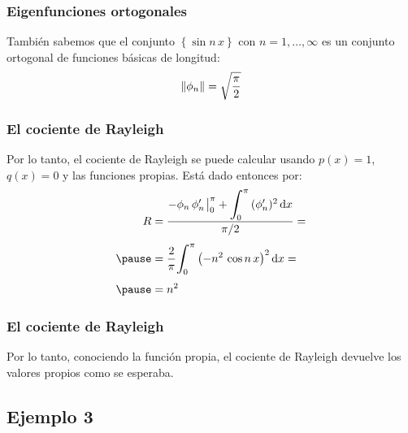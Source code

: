 \documentclass[12pt]{beamer}
\begin{document}
\begin{frame}
\frametitle{Eigenfunciones ortogonales}
También sabemos que el conjunto $\left\{ \sin n \, x \right\}$ con $n = 1, \ldots, \infty$ es un conjunto ortogonal de funciones básicas de longitud:
\pause
\begin{align*}
\norm{\phi_{n}} = \sqrt{\dfrac{\pi}{2}}
\end{align*}
\end{frame}
\begin{frame}
\frametitle{El cociente de Rayleigh}
Por lo tanto, el cociente de Rayleigh se puede calcular usando $p(x) = 1$, $q (x) = 0$ y las funciones propias. \pause Está dado entonces por:
\pause
\begin{eqnarray}
\begin{aligned}[b]
R &= \dfrac{- \phi_{n} \, \pderivada{\phi}_{n} \eval_{0}^{\pi} + \scaleint{6ex}_{\bs 0}^{\pi} \, (\pderivada{\phi}_{n})^{2} \dd{x}}{\pi/2} = \\[0.35em] \pause
&= \dfrac{2}{\pi} \scaleint{6ex}_{\bs 0}^{\pi} \left( - n^{2} \, \cos n \, x \right)^{2} \dd{x} = \\[0.35em] \pause
&= n^{2}
\end{aligned}
\label{eq:ecuacion_04_13}
\end{eqnarray}
\end{frame}
\begin{frame}
\frametitle{El cociente de Rayleigh}
Por lo tanto, conociendo la función propia, el cociente de Rayleigh devuelve los valores propios como se esperaba.
\end{frame}

\subsection*{Ejemplo 3}
\end{document}
